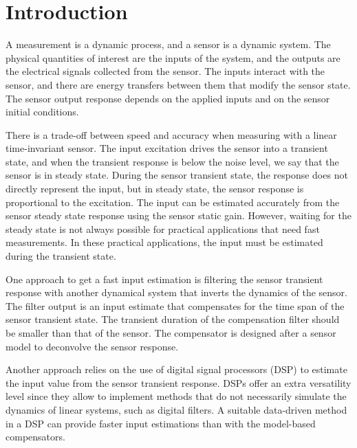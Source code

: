 \chapter{Introduction} \label{chap:Introduction}


A measurement is a dynamic process, and a sensor is a dynamic system.
The physical quantities of interest are the inputs of the system, and the outputs are the electrical signals collected from the sensor.
The inputs interact with the sensor, and there are energy transfers between them that modify the sensor state.
The sensor output response depends on the applied inputs and on the sensor initial conditions.

There is a trade-off between speed and accuracy when measuring with a linear time-invariant sensor.
The input excitation drives the sensor into a transient state, and when the transient response is below the noise level, we say that the sensor is in steady state.
During the sensor transient state, the response does not directly represent the input, but 
in steady state, the sensor response is proportional to the excitation.
The input can be estimated accurately from the sensor steady state response using the sensor static gain.
However, waiting for the steady state is not always possible for practical applications that need fast measurements.
In these practical applications, the input must be estimated during the transient state.

One approach to get a fast input estimation is filtering the sensor transient response with another dynamical system that inverts the dynamics of the sensor.
The filter output is an input estimate that compensates for the time span of the sensor transient state.
The transient duration of the compensation filter should be smaller than that of the sensor.
The compensator is designed after a sensor model to deconvolve the sensor response.

Another approach relies on the use of digital signal processors (DSP) to estimate the input value from the sensor transient response.
DSPs offer an extra versatility level since they allow to implement methods that do not necessarily simulate the dynamics of linear systems, such as digital filters.
A suitable data-driven method in a DSP can provide faster input estimations than with the model-based compensators.

